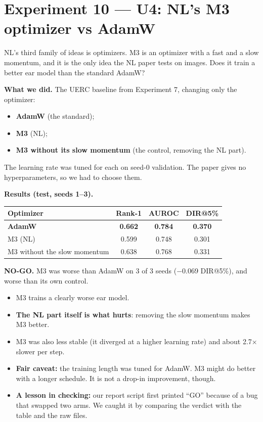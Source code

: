 \documentclass[11pt,a4paper]{article}
\begin{document}
\section{Experiment 10 --- U4: NL's M3 optimizer vs AdamW}

\begin{question}
NL's third family of ideas is optimizers. M3 is an optimizer with a fast and a slow momentum, and it is the only idea the NL paper tests on images. Does it train a better ear model than the standard AdamW?
\end{question}

\textbf{What we did.} The UERC baseline from Experiment 7, changing only the optimizer:
\begin{itemize}
  \item \textbf{AdamW} (the standard);
  \item \textbf{M3} (NL);
  \item \textbf{M3 without its slow momentum} (the control, removing the NL part).
\end{itemize}
The learning rate was tuned for each on seed-0 validation. The paper gives no hyperparameters, so we had to choose them.

\textbf{Results (test, seeds 1--3).}
\begin{center}
\begin{tabular}{@{}lccc@{}}
\toprule
\textbf{Optimizer} & \textbf{Rank-1} & \textbf{AUROC} & \textbf{DIR@5\%}\\
\midrule
\textbf{AdamW} & \textbf{0.662} & \textbf{0.784} & \textbf{0.370}\\
M3 (NL) & 0.599 & 0.748 & 0.301\\
M3 without the slow momentum & 0.638 & 0.768 & 0.331\\
\bottomrule
\end{tabular}
\end{center}

\begin{verdict}
\textbf{NO-GO.} M3 was worse than AdamW on 3 of 3 seeds ($-$0.069 DIR@5\%), and worse than its own control.
\end{verdict}

\begin{means}
\begin{itemize}[leftmargin=1.2em]
  \item M3 trains a clearly worse ear model.
  \item \textbf{The NL part itself is what hurts}: removing the slow momentum makes M3 better.
  \item M3 was also less stable (it diverged at a higher learning rate) and about 2.7$\times$ slower per step.
  \item \textbf{Fair caveat:} the training length was tuned for AdamW. M3 might do better with a longer schedule. It is not a drop-in improvement, though.
  \item \textbf{A lesson in checking:} our report script first printed ``GO'' because of a bug that swapped two arms. We caught it by comparing the verdict with the table and the raw files.
\end{itemize}
\end{means}
\end{document}
